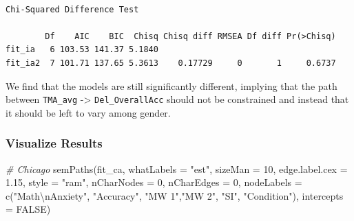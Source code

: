 \documentclass[
  letterpaper,
  DIV=11,
  numbers=noendperiod]{scrartcl}
\newenvironment{Shaded}{\begin{snugshade}}{\end{snugshade}}
\newcommand{\AttributeTok}[1]{\textcolor[rgb]{0.49,0.56,0.16}{#1}}
\newcommand{\CommentTok}[1]{\textcolor[rgb]{0.38,0.63,0.69}{\textit{#1}}}
\newcommand{\ConstantTok}[1]{\textcolor[rgb]{0.53,0.00,0.00}{#1}}
\newcommand{\DecValTok}[1]{\textcolor[rgb]{0.25,0.63,0.44}{#1}}
\newcommand{\FloatTok}[1]{\textcolor[rgb]{0.25,0.63,0.44}{#1}}
\newcommand{\FunctionTok}[1]{\textcolor[rgb]{0.02,0.16,0.49}{#1}}
\newcommand{\NormalTok}[1]{\textcolor[rgb]{0.00,0.44,0.13}{#1}}
\newcommand{\SpecialCharTok}[1]{\textcolor[rgb]{0.25,0.44,0.63}{#1}}
\newcommand{\StringTok}[1]{\textcolor[rgb]{0.25,0.44,0.63}{#1}}
\begin{document}
\begin{verbatim}

Chi-Squared Difference Test

        Df    AIC    BIC  Chisq Chisq diff RMSEA Df diff Pr(>Chisq)
fit_ia   6 103.53 141.37 5.1840                                    
fit_ia2  7 101.71 137.65 5.3613    0.17729     0       1     0.6737
\end{verbatim}

We find that the models are still significantly different, implying that
the path between \texttt{TMA\_avg} -\textgreater{}
\texttt{Del\_OverallAcc} should not be constrained and instead that it
should be left to vary among gender.

\hypertarget{visualize-results}{%
\subsubsection{Visualize Results}\label{visualize-results}}

\begin{Shaded}
\begin{Highlighting}[]
\CommentTok{\# Chicago}
\FunctionTok{semPaths}\NormalTok{(fit\_ca,}
         \AttributeTok{whatLabels =} \StringTok{"est"}\NormalTok{,}
         \AttributeTok{sizeMan =} \DecValTok{10}\NormalTok{,}
         \AttributeTok{edge.label.cex =} \FloatTok{1.15}\NormalTok{,}
         \AttributeTok{style =} \StringTok{"ram"}\NormalTok{,}
         \AttributeTok{nCharNodes =} \DecValTok{0}\NormalTok{, }\AttributeTok{nCharEdges =} \DecValTok{0}\NormalTok{,}
         \AttributeTok{nodeLabels =} \FunctionTok{c}\NormalTok{(}\StringTok{"Math}\SpecialCharTok{\textbackslash{}n}\StringTok{Anxiety"}\NormalTok{, }\StringTok{"Accuracy"}\NormalTok{,}
                        \StringTok{"MW 1"}\NormalTok{,}\StringTok{"MW 2"}\NormalTok{, }\StringTok{"SI"}\NormalTok{, }\StringTok{"Condition"}\NormalTok{),}
         \AttributeTok{intercepts =} \ConstantTok{FALSE}\NormalTok{)}
\end{Highlighting}
\end{Shaded}
\end{document}
